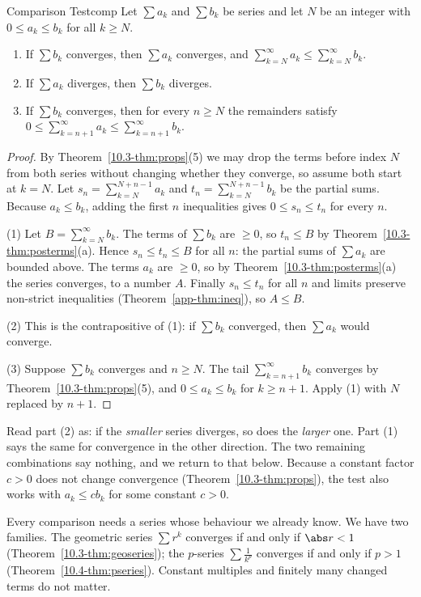 \documentclass[11pt]{article}
\begin{document}
\begin{thm}{Comparison Test}{comp}
Let $\sum a_k$ and $\sum b_k$ be series and let $N$ be an integer with $0\le a_k\le b_k$ for all $k\ge N$.
\begin{enumerate}[label=(\arabic*)]
  \item If $\sum b_k$ converges, then $\sum a_k$ converges, and $\sum_{k=N}^\infty a_k\le\sum_{k=N}^\infty b_k$.
  \item If $\sum a_k$ diverges, then $\sum b_k$ diverges.
  \item If $\sum b_k$ converges, then for every $n\ge N$ the remainders satisfy $0\le\sum_{k=n+1}^\infty a_k\le\sum_{k=n+1}^\infty b_k$.
\end{enumerate}
\end{thm}
\begin{proof}
By Theorem~\ref{10.3-thm:props}(5) we may drop the terms before index $N$ from both series without changing whether they converge, so assume both start at $k=N$. Let $s_n=\sum_{k=N}^{N+n-1}a_k$ and $t_n=\sum_{k=N}^{N+n-1}b_k$ be the partial sums. Because $a_k\le b_k$, adding the first $n$ inequalities gives $0\le s_n\le t_n$ for every $n$.

(1) Let $B=\sum_{k=N}^\infty b_k$. The terms of $\sum b_k$ are $\ge0$, so $t_n\le B$ by Theorem~\ref{10.3-thm:posterms}(a). Hence $s_n\le t_n\le B$ for all $n$: the partial sums of $\sum a_k$ are bounded above. The terms $a_k$ are $\ge0$, so by Theorem~\ref{10.3-thm:posterms}(a) the series converges, to a number $A$. Finally $s_n\le t_n$ for all $n$ and limits preserve non-strict inequalities (Theorem~\ref{app-thm:ineq}), so $A\le B$.

(2) This is the contrapositive of (1): if $\sum b_k$ converged, then $\sum a_k$ would converge.

(3) Suppose $\sum b_k$ converges and $n\ge N$. The tail $\sum_{k=n+1}^\infty b_k$ converges by Theorem~\ref{10.3-thm:props}(5), and $0\le a_k\le b_k$ for $k\ge n+1$. Apply (1) with $N$ replaced by $n+1$.
\end{proof}

Read part (2) as: if the \emph{smaller} series diverges, so does the \emph{larger} one. Part (1) says the same for convergence in the other direction. The two remaining combinations say nothing, and we return to that below. Because a constant factor $c>0$ does not change convergence (Theorem~\ref{10.3-thm:props}), the test also works with $a_k\le cb_k$ for some constant $c>0$.

\begin{remark}
Every comparison needs a series whose behaviour we already know. We have two families. The geometric series $\sum r^k$ converges if and only if $\abs r<1$ (Theorem~\ref{10.3-thm:geoseries}); the $p$-series $\sum\frac1{k^p}$ converges if and only if $p>1$ (Theorem~\ref{10.4-thm:pseries}). Constant multiples and finitely many changed terms do not matter.
\end{remark}
\end{document}
